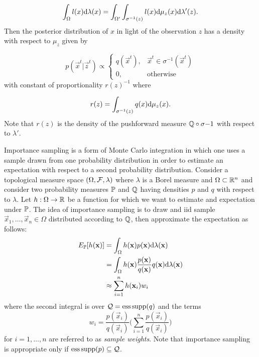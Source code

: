 \begin{equation*}
    \int_\Omega l(x) \D \lambda(x) = \int_{\Omega'}\int_{\sigma^{-1}(z)} l(x) \D \mu_z (x) \D \lambda' (z).
\end{equation*}
Then the posterior distribution of $x$ in light of the observation $z$ has a density with respect to $\mu_z$ given by

\begin{equation*}
    p(\vec{x}^t|\vec{z}^t) \propto 
    \begin{cases}
        q(\vec{x}^t), & \vec{x}^t \in \sigma^{-1}(\vec{x}^t)\\
        0, & \mbox{otherwise}
    \end{cases}
\end{equation*}
with constant of proportionality $r(z)^{-1}$ where

\begin{equation*}
    r(z) = \int_{\sigma^{-1}(z)} q(x) \D \mu_z(x).
\end{equation*}
Note that $r(z)$ is the density of the pushforward measure $\Q \circ \sigma{-1}$ with respect to $\lambda'$.

Importance sampling is a form of Monte Carlo integration in which one uses a sample drawn from one probability distribution in order to estimate an expectation with respect to a second probability distribution. Consider a topological measure space $(\Omega, \F, \lambda)$ where $\lambda$ is a Borel measure and $\Omega \subset \Real^n$ and consider two probability measures $\P$ and $\Q$ having densities $p$ and $q$ with respect to $\lambda$. Let $h : \Omega \rightarrow \Real$ be a function for which we want to estimate and expectation under $\P$. The idea of importance sampling is to draw and iid sample $\vec{x}_1 , \dots, \vec{x}_n \in \Omega$ distributed according to $\Q$, then approximate the expectation as follows:
\begin{align*}
    E_{\P}[h(\vec{x})] &= \int_{\Omega} h(\vec{x})p(\vec{x})\D\lambda(\vec{x})\\
    &= \int_{\Omega} h(\vec{x})\frac{p(\vec{x})}{q(\vec{x})}q(\vec{x})\D\lambda(\vec{x})\\
    &\approx \sum_{i=1}^n h(\vec{x}_i) w_i
\end{align*}
where the second integral is over $\Qm = \esssupp (q)$ and the terms 
\begin{equation*}
    w_i = \frac{p(\vec{x}_i)}{q(\vec{x}_i)}\Bigg ( \sum_{i=1}^n \frac{p(\vec{x}_i)}{q(\vec{x}_i)}\Bigg)
\end{equation*}
for $i = 1, \dots, n$ are referred to as \emph{sample weights}. Note that importance sampling is appropriate only if $\esssupp(p) \subseteq \Qm$.

